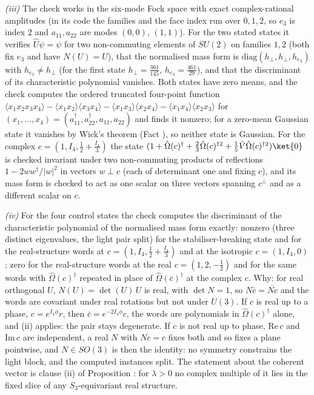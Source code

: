 \emph{(iii)} The check works in the six-mode Fock space with exact complex-rational amplitudes (in its code the families and the face index run over $0, 1, 2$, so $e_{3}$ is index $2$ and $a_{11}, a_{22}$ are modes $(0,0)$, $(1,1)$). For the two stated states it verifies $\hat{U}\psi = \psi$ for two non-commuting elements of $SU(2)$ on families $1, 2$ (both fix $e_{3}$ and have $N(U) = U$), that the normalised mass form is $\mathrm{diag}(h_{\perp}, h_{\perp}, h_{e_{3}})$ with $h_{e_{3}} \neq h_{\perp}$ (for the first state $h_{\perp} = \tfrac{361}{145}$, $h_{e_{3}} = \tfrac{461}{29}$), and that the discriminant of its characteristic polynomial vanishes. Both states have zero means, and the check computes the ordered truncated four-point function $\langle x_{1}x_{2}x_{3}x_{4}\rangle - \langle x_{1}x_{2}\rangle\langle x_{3}x_{4}\rangle - \langle x_{1}x_{3}\rangle\langle x_{2}x_{4}\rangle - \langle x_{1}x_{4}\rangle\langle x_{2}x_{3}\rangle$ for $(x_{1}, \ldots, x_{4}) = (a_{11}^{\dagger}, a_{22}^{\dagger}, a_{11}, a_{22})$ and finds it nonzero; for a zero-mean Gaussian state it vanishes by Wick's theorem (Fact ), so neither state is Gaussian. For the complex $c = (1, I_4, \tfrac12 + \tfrac{I_4}{3})$ the state $(1 + \hat\Omega(c)^{\dagger} + \tfrac23\hat\Omega(c)^{\dagger 2} + \tfrac15\hat{V}\hat\Omega(c)^{\dagger 2})\ket{0}$ is checked invariant under two non-commuting products of reflections $1 - 2ww^{\dagger}/|w|^{2}$ in vectors $w \perp c$ (each of determinant one and fixing $c$), and its mass form is checked to act as one scalar on three vectors spanning $c^{\perp}$ and as a different scalar on $c$.

\emph{(iv)} For the four control states the check computes the discriminant of the characteristic polynomial of the normalised mass form exactly: nonzero (three distinct eigenvalues, the light pair split) for the stabiliser-breaking state and for the real-structure words at $c = (1, I_4, \tfrac12 + \tfrac{I_4}{3})$ and at the isotropic $c = (1, I_4, 0)$; zero for the real-structure words at the real $c = (1, 2, -\tfrac12)$ and for the same words with $\hat\Omega(c)^{\dagger}$ repeated in place of $\hat\Omega(\bar{c})^{\dagger}$ at the complex $c$. Why: for real orthogonal $U$, $N(U) = \det(U)\,U$ is real, with $\det N = 1$, so $N\bar{c} = \overline{Nc}$ and the words are covariant under real rotations but not under $U(3)$. If $c$ is real up to a phase, $c = e^{I_4\phi}r$, then $\bar{c} = e^{-2I_4\phi}c$, the words are polynomials in $\hat\Omega(c)^{\dagger}$ alone, and (ii) applies: the pair stays degenerate. If $c$ is not real up to phase, $\mathrm{Re}\,c$ and $\mathrm{Im}\,c$ are independent, a real $N$ with $Nc = c$ fixes both and so fixes a plane pointwise, and $N \in SO(3)$ is then the identity: no symmetry constrains the light block, and the computed instances split. The statement about the coherent vector is clause (ii) of Proposition : for $\lambda > 0$ no complex multiple of it lies in the fixed slice of any $S_{3}$-equivariant real structure.
